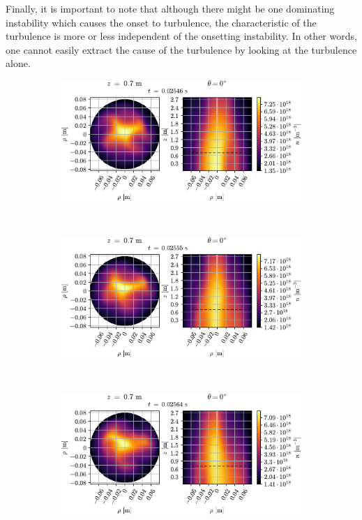 Finally, it is important to note that although there might be one dominating instability which causes the onset to turbulence, the characteristic of the turbulence is more or less independent of the onsetting instability.
In other words, one cannot easily extract the cause of the turbulence by looking at the turbulence alone.
%
{
\clearpage
\thispagestyle{empty}
\begin{figure}[htbp]
    \centering
    \begin{subfigure}[h]{1.00\textwidth}
        \centering
        \includegraphics{fig/results/evolution/n-perpPar-2D-0}
    \end{subfigure}%
    \\
    \begin{subfigure}[h]{1.00\textwidth}
        \centering
        \includegraphics{fig/results/evolution/n-perpPar-2D-1}
    \end{subfigure}
    \\
    \begin{subfigure}[h]{1.00\textwidth}
        \centering
        \includegraphics{fig/results/evolution/n-perpPar-2D-2}

\end{subfigure}
\end{figure}}
